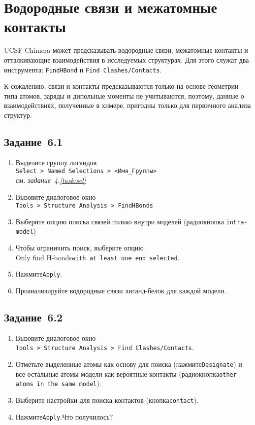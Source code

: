 \section{Водородные связи и межатомные \\ контакты}
UCSF Chimera может предсказывать водородные связи, межатомные контакты и отталкивающие взаимодействия в исследуемых структурах. Для этого служат два инструмента: \texttt{FindHBond} и \texttt{Find Clashes/Contacts}.

К сожалению, связи и контакты предсказываются только на основе геометрии типа атомов, заряды и дипольные моменты не учитываются, поэтому, данные о взаимодействиях, полученные в химере, пригодны только для первичного анализа структур.

\subsection*{Задание~6.1}
\begin{enumerate}
    \item Выделите группу лигандов\\\texttt{Select > Named Selections > <Имя\_Группы>}\\
    \textit{см. задание~4.\ref{task:sel}}
    
    \item Вызовите диалоговое окно\\\texttt{Tools~> Structure Analysis~> FindHBonds}
    
    \item Выберите опцию поиска связей только внутри моделей (радиокнопка \texttt{intra-model})
    
    \item Чтобы ограничить поиск, выберите опцию\\
    Only find H-bonds\quad\texttt{with at~least one end selected}.
    
    \item Нажмите\quad\texttt{Apply}.
    
    \item Проанализируйте водородные связи лиганд-белок для каждой модели.
\end{enumerate}

\subsection*{Задание~6.2}
\begin{enumerate}
    \item Вызовите диалоговое окно\\\texttt{Tools~> Structure Analysis~> Find Clashes/Contacts}.
    
    \item Отметьте выделенные атомы как основу для поиска (нажмите\quad\texttt{De\-sign\-ate}) и все остальные атомы модели как вероятные контакты (радиокнопка\quad\texttt{other atoms in the same model}).
    
    \item Выберите настройки для поиска контактов (кнопка\quad\texttt{contact}).
    
    \item Нажмите\quad\texttt{Apply}.\quad Что получилось?
\end{enumerate}